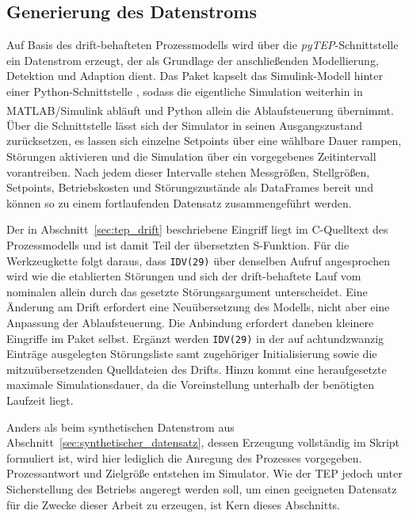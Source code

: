 \subsection{Generierung des Datenstroms} \label{sec:tep_generation}
%

%
Auf Basis des drift-behafteten Prozessmodells wird über die \textit{pyTEP}-Schnittstelle ein Datenstrom erzeugt, der als Grundlage der anschließenden Modellierung, Detektion und Adaption dient. Das Paket kapselt das Simulink-Modell hinter einer Python-Schnittstelle \cite{reinartz.2022}, sodass die eigentliche Simulation weiterhin in MATLAB\textsuperscript{\textregistered}/Simulink\textsuperscript{\textregistered} abläuft und Python allein die Ablaufsteuerung übernimmt. Über die Schnittstelle lässt sich der Simulator in seinen Ausgangszustand zurücksetzen, es lassen sich einzelne Setpoints über eine wählbare Dauer rampen, Störungen aktivieren und die Simulation über ein vorgegebenes Zeitintervall vorantreiben. Nach jedem dieser Intervalle stehen Messgrößen, Stellgrößen, Setpoints, Betriebskosten und Störungszustände als DataFrames bereit und können so zu einem fortlaufenden Datensatz zusammengeführt werden. \par
%
Der in Abschnitt~\ref{sec:tep_drift} beschriebene Eingriff liegt im C-Quelltext des Prozessmodells und ist damit Teil der übersetzten S-Funktion. Für die Werkzeugkette folgt daraus, dass \texttt{IDV(29)} über denselben Aufruf angesprochen wird wie die etablierten Störungen und sich der drift-behaftete Lauf vom nominalen allein durch das gesetzte Störungsargument unterscheidet. Eine Änderung am Drift erfordert eine Neuübersetzung des Modells, nicht aber eine Anpassung der Ablaufsteuerung. 
Die Anbindung erfordert daneben kleinere Eingriffe im Paket selbst. Ergänzt werden \texttt{IDV(29)} in der auf achtundzwanzig Einträge ausgelegten Störungsliste samt zugehöriger Initialisierung sowie die mitzuübersetzenden Quelldateien des Drifts. Hinzu kommt eine heraufgesetzte maximale Simulationsdauer, da die Voreinstellung unterhalb der benötigten Laufzeit liegt. \par
%
%
Anders als beim synthetischen Datenstrom aus Abschnitt~\ref{sec:synthetischer_datensatz}, dessen Erzeugung vollständig im Skript formuliert ist, wird hier lediglich die Anregung des Prozesses vorgegeben. Prozessantwort und Zielgröße entstehen im Simulator. Wie der \ac{TEP} jedoch unter Sicherstellung des Betriebs angeregt werden soll, um einen geeigneten Datensatz für die Zwecke dieser Arbeit zu erzeugen, ist Kern dieses Abschnitts.  
